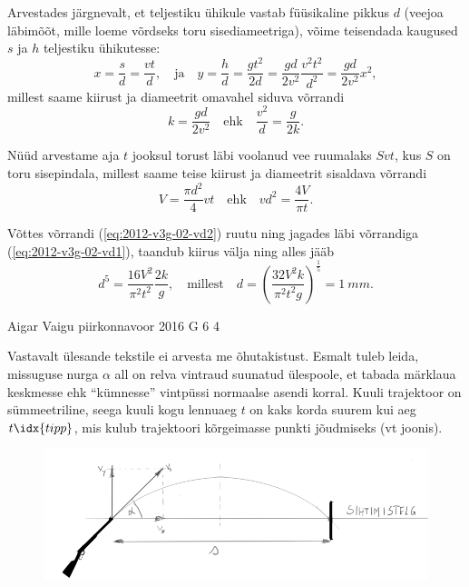 \documentclass[11pt, twoside]{article}
\begin{document}
{{Arvestades järgnevalt, et teljestiku ühikule vastab füüsikaline pikkus $d$ (veejoa läbimõõt, mille loeme võrdseks toru sisediameetriga), võime teisendada kaugused $s$ ja $h$ teljestiku ühikutesse:
\[x=\frac{s}{d}=\frac{vt}{d},\quad \mathrm{ja} \quad y=\frac{h}{d}=\frac{gt^2}{2d}=\frac{gd}{2v^2}\frac{v^2t^2}{d^2}=\frac{gd}{2v^2}x^2,\]
millest saame kiirust ja diameetrit omavahel siduva võrrandi
\begin{equation}\label{eq:2012-v3g-02-vd1}
k=\frac{gd}{2v^2}\quad \mathrm{ehk} \quad \frac{v^2}{d}=\frac{g}{2k}.
\end{equation}
	
Nüüd arvestame aja $t$ jooksul torust läbi voolanud vee ruumalaks $Svt$, kus $S$ on toru sisepindala, millest saame teise kiirust ja diameetrit sisaldava võrrandi
\begin{equation}\label{eq:2012-v3g-02-vd2}
V=\frac{\pi d^2}{4}vt \quad \mathrm{ehk} \quad vd^2=\frac{4V}{\pi t}.
\end{equation}

Võttes võrrandi (\ref{eq:2012-v3g-02-vd2}) ruutu ning jagades läbi võrrandiga (\ref{eq:2012-v3g-02-vd1}), taandub kiirus välja ning alles jääb
\[d^5=\frac{16V^2}{\pi^2t^2}\frac{2k}{g}, \quad \mathrm{millest} \quad d=\left(\frac{32V^2k}{\pi^2 t^2 g}\right)^{\frac{1}{5}}=\SI{1}{mm	}.\]
\fi
}

{Aigar Vaigu} %
{piirkonnavoor} %
{2016} %
{G 6} %
{4} %
{

\ifSolution
Vastavalt ülesande tekstile ei arvesta me õhutakistust.
Esmalt tuleb leida, missuguse nurga $\alpha$ all on relva vintraud suunatud ülespoole, et tabada märklaua keskmesse ehk \enquote{kümnesse} vintpüssi normaalse asendi korral. Kuuli trajektoor on sümmeetriline, seega kuuli kogu lennuaeg $t$ on kaks korda suurem kui aeg $t\idx{tipp}$, mis kulub trajektoori kõrgeimasse punkti jõudmiseks (vt joonis).
\begin{figure}[h!]
	\centering
	\includegraphics[scale=0.55]{2016-v2g-06-Lasketiir-1.PNG}
\end{figure}

}}
\end{document}
